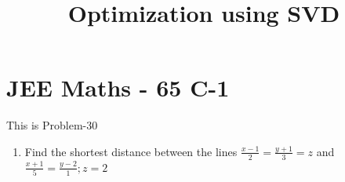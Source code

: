 \documentclass[12pt]{article}
\begin{document}
\begin{center}
\title{\textbf{Optimization using SVD }}
\date{\vspace{-5ex}} %
\maketitle
\end{center}
\setcounter{page}{1}

\section{JEE Maths - 65 C-1}
This is Problem-30 
\begin{enumerate}
\item Find the shortest distance between the lines $\frac{x-1}{2} = \frac{y+1}{3}=z$ and $\frac{x+1}{5} = \frac{y-2}{1}; z=2 $ 


\end{enumerate}
\end{document}
